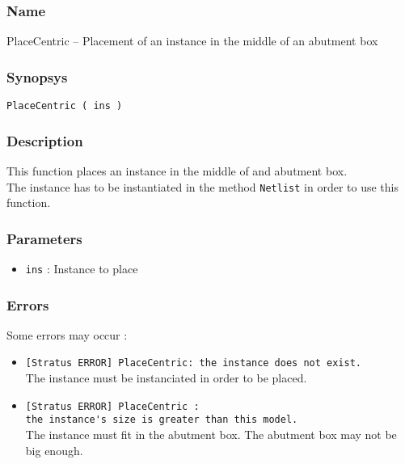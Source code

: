 \subsubsection{Name}

PlaceCentric -- Placement of an instance in the middle of an abutment box

\subsubsection{Synopsys}

\begin{verbatim}
PlaceCentric ( ins )
\end{verbatim}

\subsubsection{Description}

This function places an instance in the middle of and abutment box.\\
\indent The instance has to be instantiated in the method \verb-Netlist- in order to use this function.
    
\subsubsection{Parameters}

\begin{itemize}
    \item \verb-ins- : Instance to place
\end{itemize}

%
%
\subsubsection{Errors}
    
Some errors may occur :
\begin{itemize}
    \item \verb-[Stratus ERROR] PlaceCentric: the instance does not exist.-\\The instance must be instanciated in order to be placed.
    \item \verb-[Stratus ERROR] PlaceCentric :-\\\verb-the instance's size is greater than this model.-\\The instance must fit in the abutment box. The abutment box may not be big enough.
\end{itemize}

